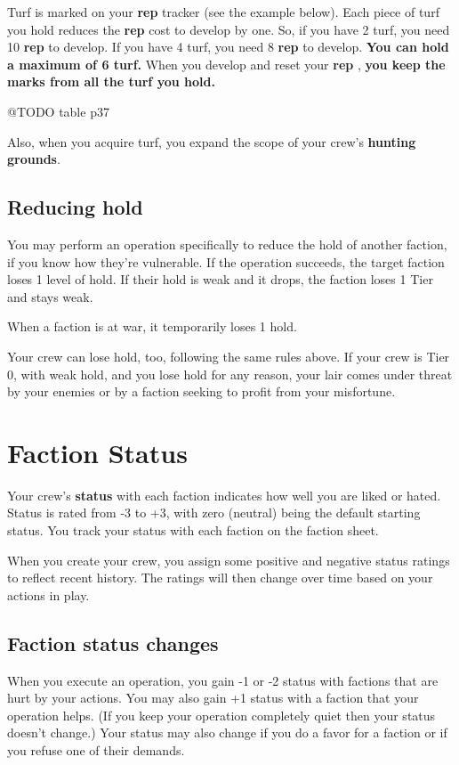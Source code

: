 \documentclass[11pt,oneside]{book}
\newcommand{\gameterm}[1]{\textbf{#1}}
\begin{document}
Turf is marked on your \gameterm{rep}  tracker (see the example below). Each piece of turf you hold reduces the \gameterm{rep}  cost to develop by one. So, if you have 2 turf, you need 10 \gameterm{rep}  to develop. If you have 4 turf, you need 8 \gameterm{rep}  to develop. \textbf{You can hold a maximum of 6 turf.} When you develop and reset your \gameterm{rep} , \textbf{you keep the marks from all the turf you hold.}

@TODO table p37

Also, when you acquire turf, you expand the scope of your crew’s \textbf{hunting grounds}.

\subsection{Reducing hold}

You may perform an operation specifically to reduce the hold of another faction, if you know how they’re vulnerable. If the operation succeeds, the target faction loses 1 level of hold. If their hold is weak and it drops, the faction loses 1 Tier and stays weak.

When a faction is at war, it temporarily loses 1 hold.

Your crew can lose hold, too, following the same rules above. If your crew is Tier 0, with weak hold, and you lose hold for any reason, your lair comes under threat by your enemies or by a faction seeking to profit from your misfortune.

\section{Faction Status}

Your crew’s \textbf{status} with each faction indicates how well you are liked or hated. Status is rated from -3 to +3, with zero (neutral) being the default starting status. You track your status with each faction on the faction sheet.

When you create your crew, you assign some positive and negative status ratings to reflect recent history. The ratings will then change over time based on your actions in play.

\subsection{Faction status changes}

When you execute an operation, you gain -1 or -2 status with factions that are hurt by your actions. You may also gain +1 status with a faction that your operation helps. (If you keep your operation completely quiet then your status doesn’t change.) Your status may also change if you do a favor for a faction or if you refuse one of their demands.
\end{document}
